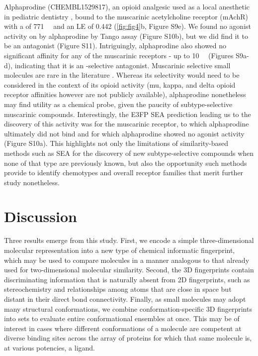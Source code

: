 \documentclass[../../main.tex]{subfiles}
\begin{document}
\begin{refsection}
	Alphaprodine (CHEMBL1529817), an opioid analgesic used as a local anesthetic in pediatric dentistry \supercite{moore_1988}, bound to the muscarinic acetylcholine receptor (mAchR)  with a  \Ki{} of \SI{771}{\nano\molar} and an LE of 0.442 \LEunit{} (\cref{fig:fig4}b, Figure S9e).
	We found no agonist activity on   by alphaprodine by Tango assay  \supercite{barnea_2008,kroeze_2015} (Figure S10b), but we did find it to be an antagonist (Figure S11).
	Intriguingly, alphaprodine also showed no significant affinity for any of the muscarinic receptors  - up to \SI{10}{\micro\molar} (Figures S9a-d), indicating that it is an -selective antagonist.
	Muscarinic  selective small molecules are rare in the literature \supercite{gentry_2014}.
	Whereas its  selectivity would need to be considered in the context of its opioid activity (mu, kappa, and delta opioid receptor affinities however are not publicly available), alphaprodine nonetheless may find utility as a   chemical probe, given the paucity of subtype-selective muscarinic compounds.
	Interestingly, the E3FP SEA prediction leading us to the discovery of this activity was for the muscarinic  receptor, to which alphaprodine ultimately did not bind and for which alphaprodine showed no agonist activity  (Figure S10a).
	This highlights not only the limitations of similarity-based methods such as SEA for the discovery of new subtype-selective compounds when none of that type are previously known, but also the opportunity such methods provide to identify chemotypes and overall receptor families that merit further study nonetheless.

	\section{Discussion}

	Three results emerge from this study.
	First, we encode a simple three-dimensional molecular representation into a new type of chemical informatic fingerprint, which may be used to compare molecules in a manner analogous to that already used for two-dimensional molecular similarity.
	Second, the 3D fingerprints contain discriminating information that is naturally absent from 2D fingerprints, such as stereochemistry and relationships among atoms that are close in space but distant in their direct bond connectivity.
	Finally, as small molecules may adopt many structural conformations, we combine conformation-specific 3D fingerprints into sets to evaluate entire conformational ensembles at once.
	This may be of interest in cases where different conformations of a molecule are competent at diverse binding sites across the array of proteins for which that same molecule is, at various potencies, a ligand.


\end{refsection}
\end{document}
